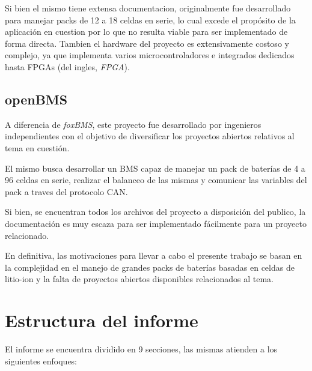 \documentclass[10pt, a4paper]{report}
\begin{document}
\noindent Si bien el mismo tiene extensa documentacion, originalmente fue
desarrollado para manejar packs de 12 a 18 celdas en serie, lo cual excede el
prop\'osito de la aplicaci\'on en cuestion por lo que no resulta viable para ser
implementado de forma directa. Tambien el hardware del proyecto es
extensivamente costoso y complejo, ya que implementa varios microcontroladores e
integrados dedicados hasta \acrshort{FPGA}s (del ingles, \emph{\acrlong{FPGA}}).

\subsection{openBMS}

A diferencia de \emph{foxBMS}, este proyecto fue desarrollado por ingenieros
independientes con el objetivo de diversificar los proyectos abiertos relativos
al tema en cuesti\'on.

\noindent El mismo busca desarrollar un \acrshort{BMS} capaz de manejar un
pack de bater\'ias de 4 a 96 celdas en serie, realizar el balanceo de las mismas 
y comunicar las variables del pack a traves del protocolo \acrshort{CAN}.

\noindent Si bien, se encuentran todos los archivos del proyecto a disposición
del publico, la documentaci\'on es muy escaza para ser implementado
f\'acilmente para un proyecto relacionado.

\noindent En definitiva, las motivaciones para llevar a cabo el presente trabajo
se basan en la complejidad en el manejo de grandes packs de
bater\'ias basadas en celdas de litio-ion y la falta de proyectos abiertos
disponibles relacionados al tema.

\section{Estructura del informe}

El informe se encuentra dividido en 9 secciones, las mismas atienden a los siguientes enfoques:
\end{document}
